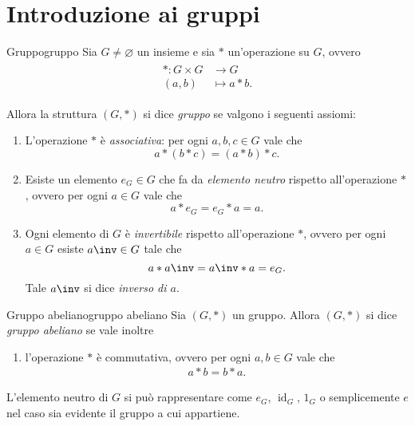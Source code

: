 \section{Introduzione ai gruppi}

\begin{definition}
    {Gruppo}{gruppo}
    Sia $G \neq \varnothing$ un insieme e sia $\ast$ un'operazione su $G$, ovvero \begin{align} \begin{split}
        \ast : G  \times  G &\to       G  \\
            (a, b)       &\mapsto  a\ast b.
    \end{split} \end{align}

    Allora la struttura $(G, \ast)$ si dice \emph{gruppo} se valgono i seguenti assiomi: \begin{enumerate}[(G1)]
        \item \label{def:gruppo:ass} L'operazione $\ast$ è \emph{associativa}: per ogni $a, b, c \in G$ vale che \[
            a \ast (b \ast c) = (a \ast b) \ast c.
        \]
        \item Esiste un elemento $e_G \in G$ che fa da \emph{elemento neutro} rispetto all'operazione $\ast$, ovvero per ogni $a \in G$ vale che \[
            a \ast e_G = e_G \ast a = a.
        \]
        \item Ogni elemento di $G$ è \emph{invertibile} rispetto all'operazione $\ast$, ovvero per ogni $a \in G$ esiste $a\inv \in G$ tale che \[
            a \ast a\inv = a\inv \ast a = e_G.
        \] Tale $a\inv$ si dice \emph{inverso di $a$}.
    \end{enumerate}
\end{definition}

\begin{definition}
    {Gruppo abeliano}{gruppo abeliano}
    Sia  $(G, \ast)$ un gruppo.
    Allora $(G, \ast)$ si dice \emph{gruppo abeliano} se vale inoltre \begin{enumerate}[label={(G1)}, start=4]
        \item l'operazione $\ast$ è commutativa, ovvero per ogni $a, b \in G$ vale che \begin{align*}
            a \ast b = b \ast a.
        \end{align*}
    \end{enumerate}
\end{definition}

L'elemento neutro di $G$ si può rappresentare come $e_G$, $\operatorname{id}_G$, $1_G$ o semplicemente $e$ nel caso sia evidente il gruppo a cui appartiene.


